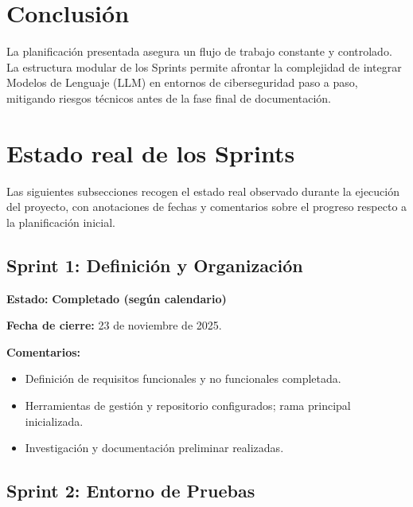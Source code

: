 \documentclass[12pt,a4paper]{article}
\begin{document}
\section{Conclusión}

La planificación presentada asegura un flujo de trabajo constante y controlado. La estructura modular de los Sprints permite afrontar la complejidad de integrar Modelos de Lenguaje (LLM) en entornos de ciberseguridad paso a paso, mitigando riesgos técnicos antes de la fase final de documentación.

\newpage
\section{Estado real de los Sprints}

Las siguientes subsecciones recogen el estado real observado durante la ejecución del proyecto, con anotaciones de fechas y comentarios sobre el progreso respecto a la planificación inicial.


\subsection{Sprint 1: Definición y Organización}

\textbf{Estado:} \textcolor{ontime}{\textbf{Completado (según calendario)}}

\textbf{Fecha de cierre:} 23 de noviembre de 2025.

\textbf{Comentarios:}
\begin{itemize}
    \item Definición de requisitos funcionales y no funcionales completada.
    \item Herramientas de gestión y repositorio configurados; rama principal inicializada.
    \item Investigación y documentación preliminar realizadas.
\end{itemize}

\subsection{Sprint 2: Entorno de Pruebas}
\end{document}
